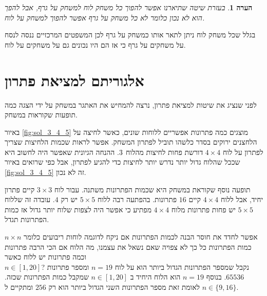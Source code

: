 \documentclass[12pt,leqno]{article}
\newtheorem{comm}{הערה}[section]
\begin{document}
\begin{comm}
    בעזרת שיטה שתיארנו אפשר להפוך כל משחק לוח למשחק על גרף, אבל להפך הוא לא נכון 
    כלומר לא כל משחק על גרף אפשר להפוך למשחק על לוח.
\end{comm}

בגלל שכל משחק לוח ניתן לתאר אותו כמשחק על גרף לכן המשפטים המרכזיים ננסה לנסח על משחקים על גרף כי אז הם היו נכונים
גם על משחקים על לוח.


\newpage

\section{ אלגוריתם למציאת פתרון}

לפני שנציג את שיטות למציאת פתרון, נרצה להמחיש את 
האתגר במשחק על ידי הצגה כמה תופעות שקוראות במשחק.

באיור
\ref{fig:sol_3_4_5}
מוצגים כמה פתרונות אפשריים ללוחות שונים, כאשר לחיצה על הלחצנים ירוקים
בסדר כלשהו תוביל לפתרון המשחק.
אפשר לראות שכמות הלחיצות שצריך לפתרון 
על לוח 
$4 \times 4$
דורשת פחות לחיצות מהלוח 
$3 \time 3$.
ההנחה הגיונית 
שאפשר היה לחשוב היא שככל שהלוח גדול יותר נדרש 
יותר לחיצות 
כדי להגיע לפתרון,
אבל כפי שרואים 
באיור 
\ref{fig:sol_3_4_5}
זה לא נכון.

תופעה נוסף שקוראת במשחק היא שכמות הפתרונות משתנה.
עבור לוח 
$3 \times 3$
קיים פתרון יחיד,
אבל ללוח 
$4 \times 4$
קיים
$16$
פתרונות.
בהפתעה רבה ללוח 
$5 \times 5$
יש רק 
$4$.
עובדה זה שללוח 
$5 \times 5$
יש פחות פתרונות מלוח 
$4 \times 4$
מפתיע כי אפשר היה לצפות שלוח יותר גדול אז כמות הפתרונות תגדל.

אפשר לחדד את חוסר הבנה לכמות הפתרונות אם ניקח לדוגמה לוחות ריבועים כלומר
$n \times n$
כמות הפתרונות כל כך לא צפויה
שאם נשאל את עצמנו, מה הלוח אם הכי הרבה פתרונות וכמה פתרונות יש ללוח כאשר
\\
$n \in [1,20]$?
נקבל שמספר הפתרונות הגדול ביותר הוא על לוח
$n = 19$ 
ומספר פתרונות 
$65536$.
בנוסף
$n = 19$ 
הוא הלוח היחיד ב
$n \in [1,20]$
שמקבל
כמות הפתרונות שכזה.
לאומת זאת
מספר הפתרונות השני הגדול ביותר הוא רק
$256$
ומתקיים ל
$n \in \{9, 16 \}$.
\end{document}
